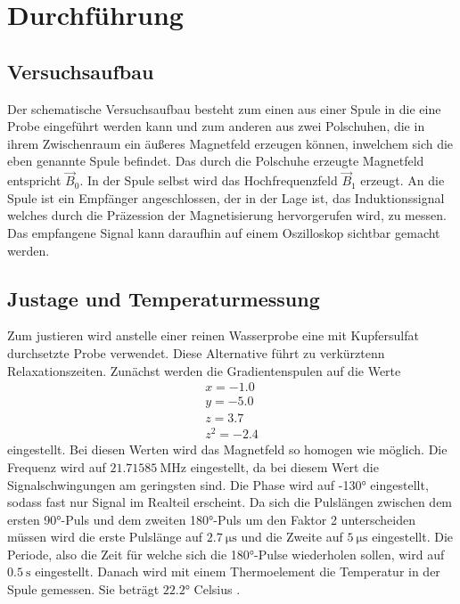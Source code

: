 \section{Durchführung}
\label{sec:Durchführung}

\subsection{Versuchsaufbau}
\label{sec:Versuchsaufbau}

Der schematische Versuchsaufbau besteht zum einen aus einer Spule in die eine Probe 
eingeführt 
werden kann und zum anderen aus zwei Polschuhen, die in ihrem Zwischenraum ein 
äußeres Magnetfeld erzeugen können, inwelchem sich die eben genannte Spule befindet. 
Das durch die Polschuhe erzeugte Magnetfeld entspricht $\vec{B}_{\text{0}}$.
In der Spule selbst wird das Hochfrequenzfeld $\vec{B}_{\text{1}}$ erzeugt.
An die Spule ist ein Empfänger angeschlossen, der in der Lage ist, das Induktionssignal 
welches durch die Präzession der Magnetisierung hervorgerufen wird, zu messen.
Das empfangene Signal kann daraufhin auf einem Oszilloskop sichtbar gemacht werden.

\subsection{Justage und Temperaturmessung}
\label{sec:Justage}

Zum justieren wird anstelle einer reinen Wasserprobe eine mit Kupfersulfat 
durchsetzte Probe verwendet. Diese Alternative führt zu verkürztenn Relaxationszeiten.
Zunächst werden die Gradientenspulen auf die Werte
\begin{align}
    x = -1.0\\
    y = -5.0\\
    z = 3.7\\
    z^2 = -2.4
\end{align}
eingestellt. Bei diesen Werten wird das Magnetfeld so homogen wie möglich.
Die Frequenz wird auf $\SI{21.71585}{\mega\hertz}$ eingestellt,
da bei diesem Wert die Signalschwingungen am geringsten sind. Die Phase wird auf 
-130° eingestellt, sodass fast nur Signal im Realteil erscheint.
Da sich die Pulslängen zwischen dem ersten 90°-Puls und dem zweiten 180°-Puls
um den Faktor 2 unterscheiden müssen wird die 
erste Pulslänge auf $\SI{2.7}{\micro\second}$ und die Zweite auf 
$\SI{5}{\micro\second}$ eingestellt.
Die Periode, also die Zeit für welche sich die 180°-Pulse wiederholen sollen,
wird auf $\SI{0.5}{\second}$ eingestellt.
Danach wird mit einem Thermoelement die Temperatur in der Spule gemessen.
Sie beträgt $22.2$° Celsius \cite{anleitung}.

